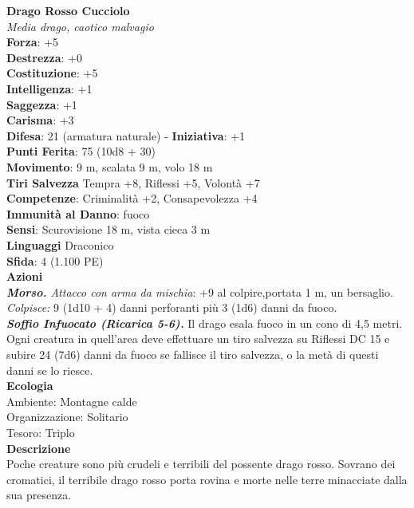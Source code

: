\begin{multicols}{2}
\medskip\textbf{Drago Rosso Cucciolo}\\
\emph{Media drago, caotico malvagio}\\
\textbf{Forza}: +5\\
\textbf{Destrezza}: +0\\
\textbf{Costituzione}: +5\\
\textbf{Intelligenza}: +1\\
\textbf{Saggezza}: +1\\
\textbf{Carisma}: +3\\
\textbf{Difesa}: 21 (armatura naturale) - \textbf{Iniziativa}: +1\\
\textbf{Punti Ferita}: 75 (10d8 + 30)\\
\textbf{Movimento}: 9 m, scalata 9 m, volo 18 m\\
\textbf{Tiri Salvezza} Tempra +8, Riflessi +5, Volontà +7\\
\textbf{Competenze}: Criminalità +2, Consapevolezza +4\\
\textbf{Immunità al Danno}: fuoco\\
\textbf{Sensi}: Scurovisione 18 m, vista cieca 3 m\\
\textbf{Linguaggi} Draconico\\
\textbf{Sfida}: 4 (1.100 PE)\smallskip\\
\smallskip\textbf{Azioni}\\
\emph{\textbf{Morso.} Attacco con arma da mischia}: +9 al colpire,portata 1 m, un bersaglio. \\
\emph{Colpisce:} 9 (1d10 + 4) danni perforanti più 3 (1d6) danni da fuoco.\\
\emph{\textbf{Soffio Infuocato (Ricarica 5-6).}} Il drago esala fuoco in un cono di 4,5 metri. Ogni creatura in quell'area deve effettuare un tiro salvezza su Riflessi DC  15 e subire 24 (7d6) danni da fuoco se fallisce il tiro salvezza, o la metà di questi danni se lo riesce.\\
\textbf{Ecologia}\\
Ambiente: Montagne calde\\
Organizzazione: Solitario\\
Tesoro: Triplo\\
\textbf{Descrizione}\\
Poche creature sono più crudeli e terribili del possente drago rosso. Sovrano dei cromatici, il terribile drago rosso porta rovina e morte nelle terre minacciate dalla sua presenza.\\


\end{multicols}
